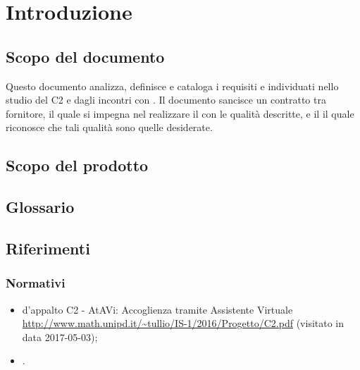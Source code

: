 \section{Introduzione}
 \subsection{Scopo del documento}
 Questo documento analizza, definisce e cataloga i requisiti e  individuati nello studio del  C2 e dagli incontri con \PROPONENTE. 
 Il documento sancisce un contratto tra fornitore, il quale si impegna nel realizzare il  con le qualità descritte,  e il  il quale riconosce che tali qualità sono quelle desiderate. 
 \subsection{Scopo del prodotto}
 \SCOPO
 \subsection{Glossario}
 \GLOSSARIO
 \subsection{Riferimenti}
  \subsubsection{Normativi}
  \begin{itemize}
  	\item {} d'appalto C2 - AtAVi: Accoglienza tramite Assistente Virtuale \\
  	\url{http://www.math.unipd.it/~tullio/IS-1/2016/Progetto/C2.pdf} (visitato in data 2017-05-03);
    \item \NPdoc.
  \end{itemize}
